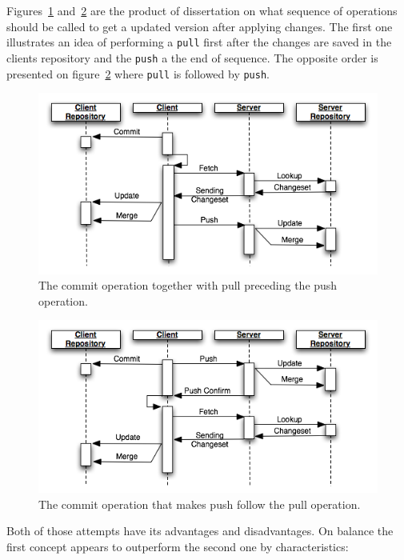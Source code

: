 Figures~\ref{fig:seq_commit} and~\ref{fig:seq_commit2} are the product of  dissertation on what sequence of operations should be called to get a updated version after applying changes. The first one illustrates an idea of performing a \texttt{pull} first after the changes are saved in the clients repository and the \texttt{push} a the end of sequence. The opposite order is presented on figure~\ref{fig:seq_commit2} where \texttt{pull} is followed by \texttt{push}. 
\begin{figure}[ht]
\begin{center}
\includegraphics[scale=0.6]{charts/seq_commit.png}
\caption{The commit operation together with pull preceding the push operation.}
\label{fig:seq_commit}
\end{center}
\end{figure}
\begin{figure}[ht]
\begin{center}
\includegraphics[scale=0.6]{charts/seq_commit2.png}
\caption{The commit operation that makes push follow the pull operation.}
\label{fig:seq_commit2}
\end{center}
\end{figure}
\newline Both of those attempts have its advantages and disadvantages. On balance the first concept appears to outperform the second one by characteristics:
